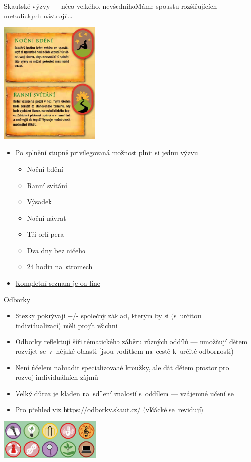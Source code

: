 \documentclass[compress, ucs, xelatex, 11pt, xcolor=dvipsnames, print,
	hyperref={
		bookmarks=true,
		unicode=true,
		colorlinks=true,
		pdftitle={Skautska vychovna metoda},
		plainpages=false,
		pdfauthor={Vojtech Zeisek},
		pdfsubject={Skautska vychovna metoda a jeji vyvoj za posledni stoleti a desetileti},
		pdfcreator={XeLaTeX},
		pdfkeywords={Junak, Pedagogika, Skaut, Skauting, Vychovna metoda},
		linkcolor=Black,
		anchorcolor=Black,
		citecolor=OliveGreen,
		filecolor=OliveGreen,
		menucolor=Black,
		urlcolor=OliveGreen,
		pdftex},
	url={hyphens, lowtilde} %
	]{beamer}
\begin{document}
\begin{frame}{Skautské výzvy --- něco velkého, nevšedního}{Máme spoustu rozšiřujících metodických nástrojů\ldots}
	\begin{multicols}{2}
		\includegraphics[height=6.1cm]{vyzvy.png}
		\begin{itemize}
			\item Po splnění stupně privilegovaná možnost plnit si jednu výzvu
			\begin{itemize}
				\item Noční bdění
				\item Ranní svítání
				\item Výsadek
				\item Noční návrat
				\item Tři orlí pera
				\item Dva dny bez ničeho
				\item 24 hodin na~stromech
			\end{itemize}
			\item \href{https://krizovatka.skaut.cz/oddil/program/skautky-a-skauti/skauti-skautky-stezky/skauti-skautky-stezky-vyzvy}{Kompletní seznam je on-line}
		\end{itemize}
	\end{multicols}
\end{frame}

\begin{frame}{Odborky}
	\begin{itemize}
		\item Stezky pokrývají +/- společný základ, kterým by si (s~určitou individualizací) měli projít všichni
		\item Odborky reflektují šíři tématického záběru různých oddílů --- umožňují dětem rozvíjet se~v~nějaké oblasti (jsou vodítkem na~cestě k~určité odbornosti)
		\item Není účelem nahradit specializované kroužky, ale dát dětem prostor pro rozvoj individuálních zájmů
		\item Velký důraz je kladen na~sdílení znalostí s~oddílem --- vzájemné učení se
		\item Pro přehled viz \url{https://odborky.skaut.cz/} (vlčácké se~revidují)
	\end{itemize}
	\begin{center}
		\includegraphics[height=2cm]{odborky.jpg}
	\end{center}
\end{frame}
\end{document}
